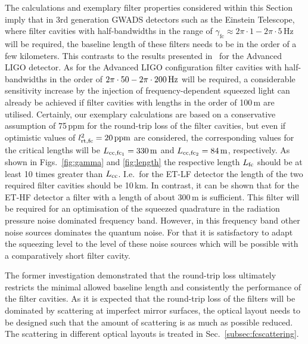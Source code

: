 The calculations and exemplary filter properties considered within
this Section imply that in 3rd generation GWADS
detectors such as the Einstein Telescope, where filter cavities with half-bandwidths
in the range of ${\gamma_\text{fc}\approx 2\pi\cdot1- 2\pi\cdot5\,\mathrm{Hz}}$ will be
required, the baseline length of these filters needs to be in the
order of a few kilometers. This contrasts to the results presented
in~\cite{Khalili2009} for the Advanced LIGO
detector. As for the Advanced LIGO configuration filter cavities with
half-bandwidths in the order of ${2\pi\cdot50- 2\pi\cdot200\,{\rm Hz}}$ will be required, a
considerable sensitivity increase by the injection of frequency-dependent squeezed light can already be achieved if filter
cavities with lengths in the order of 100\,m are utilised. Certainly,
our exemplary calculations are based on a conservative assumption
of 75\,ppm for the round-trip loss of the filter cavities, but
even if optimistic values of $l_{\rm rt,fc}^2=20\,\mathrm{ppm}$ are
considered, the corresponding values for the critical lengths will
be $L_{\rm cc, fc_1} = 330\,{\rm m}$ and  $L_{\rm cc, fc_2} =
84\,{\rm m}$, respectively. As shown in Figs.~\ref{fig:gamma}
and \ref{fig:length} the respective length $L_{\rm fc}$ should be
at least 10 times greater than $L_{\rm cc}$.   I.e.\ for the ET-LF detector the  length of the two required filter cavities should be 10\,km. In contrast, it can be shown that for the ET-HF detector a filter with a length of about 300\,m is sufficient. This filter will be required for an optimisation of the squeezed quadrature in the radiation pressure noise dominated frequency band. However, in this frequency band other noise sources dominates the quantum noise. For that it is satisfactory to adapt the squeezing level to the level of these noise sources which will be possible with a comparatively short filter cavity.



The former investigation demonstrated that  the round-trip loss ultimately restricts the minimal allowed baseline length and consistently the performance of the filter cavities. As it is expected that the round-trip loss of the filters will be dominated by scattering at imperfect mirror surfaces, the optical layout needs to be designed such that the amount of scattering is as much as possible reduced. The scattering in different optical layouts is treated in Sec.~\ref{subsec:fcscattering}.

